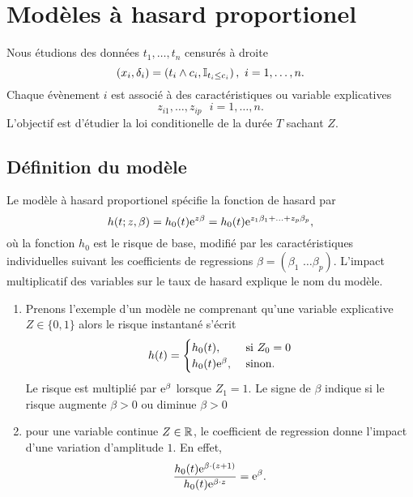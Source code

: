 \chapter{Modèles à hasard proportionel}\label{chap:Ph_models}
Nous étudions des données $t_1,\ldots, t_n$ censurés à droite 
$$
(x_i,\delta_i) = \left(t_i\land c_i,\mathbb{I}_{t_i\leq c_i}\right),\text{  }i=1,\ldots, n.
$$
Chaque évènement $i$ est associé à des caractéristiques ou variable explicatives 
$$
z_{i1},\ldots, z_{ip}\text{ }i=1,\ldots, n.
$$
L'objectif est d'étudier la loi conditionelle de la durée $T$ sachant $Z$.
\section{Définition du modèle}
Le modèle à hasard proportionel spécifie la fonction de hasard par 
\begin{equation}\label{eq:cox_proportional_hazard}
h(t; z, \beta) = h_0(t)\mathrm{e}^{z \beta}=h_0(t)\mathrm{e}^{z_1\beta_1+\ldots+z_p\beta_p},
\end{equation}
où la fonction $h_0$ est le risque de base, modifié par les caractéristiques individuelles suivant les coefficients de regressions $\beta = (\beta_1\text{ \ldots }\beta_p)$. L'impact multiplicatif des variables sur le taux de hasard explique le nom du modèle.
\begin{ex}
	\begin{enumerate}
		\item Prenons l'exemple d'un modèle ne comprenant qu'une variable explicative $Z\in\{0,1\}$ alors le risque instantané s'écrit 
		$$
		h(t)=\begin{cases}
		h_0(t),&\text{ si }Z_0 = 0\\
		h_0(t)\mathrm{e}^{\beta},&\text{ sinon}.
		\end{cases}
		$$
		Le risque est multiplié par $\mathrm{e}^\beta$ lorsque $Z_1=1$. Le signe de $\beta$ indique si le risque augmente $\beta>0$ ou diminue $\beta>0$
		\item pour une variable continue $Z\in \mathbb{R}$, le coefficient de regression donne l'impact d'une variation d'amplitude $1$. En effet, 
		$$
\frac{h_0(t)\mathrm{e}^{\beta\cdot (z+1)}}{h_0(t)\mathrm{e}^{\beta\cdot z}} = \mathrm{e}^{\beta}.
		$$
	\end{enumerate}
\end{ex}
